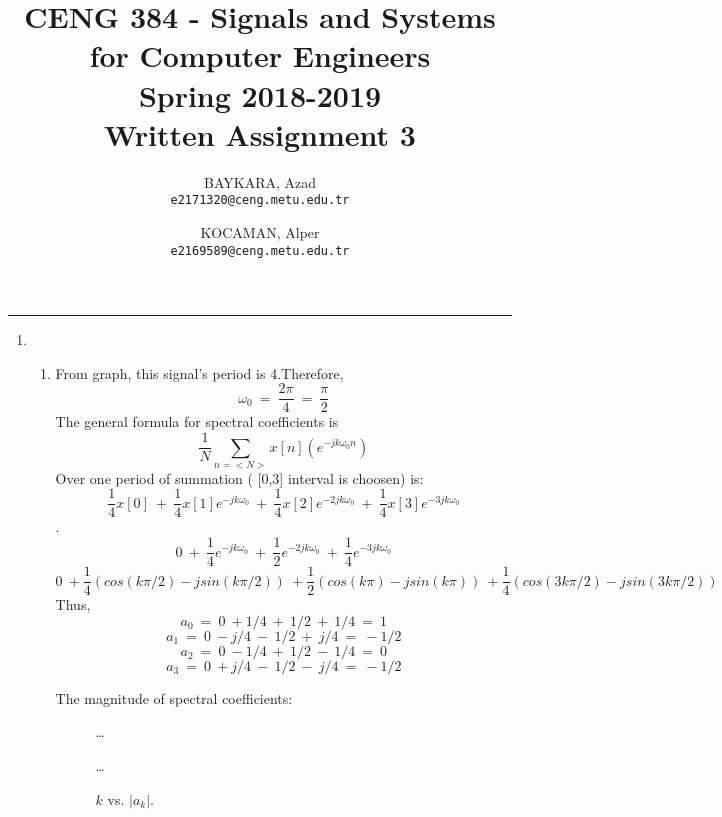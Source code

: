 \documentclass[10pt,a4paper, margin=1in]{article}
\author{
  BAYKARA, Azad\\
  \texttt{e2171320@ceng.metu.edu.tr}
  \and
  KOCAMAN, Alper\\
  \texttt{e2169589@ceng.metu.edu.tr}
}
\title{CENG 384 - Signals and Systems for Computer Engineers \\
Spring 2018-2019 \\
Written Assignment 3}
\begin{document}
\maketitle



\noindent\rule{19cm}{1.2pt}

\begin{enumerate}

\item 
    \begin{enumerate}
    \item %
From graph, this signal's period is 4.Therefore,
$$\omega_0\ =\ \frac{2\pi}{4}\ = \ \frac{\pi}{2} $$
The general formula for spectral coefficients is $$ \frac{1}{N}\sum_{n=<N>}^{} x[n](e^{-jk\omega_0 n})$$
Over one period of summation ( [0,3] interval is choosen) is:
$$ \frac{1}{4}x[0]\ + \  \frac{1}{4}x[1]e^{-jk\omega_0}\ + \   \frac{1}{4}x[2]e^{-2jk\omega_0}\ + \  \frac{1}{4}x[3]e^{-3jk\omega_0}$$.\\
$$ 0\ + \  \frac{1}{4}e^{-jk\omega_0}\ + \   \frac{1}{2}e^{-2jk\omega_0}\ + \  \frac{1}{4}e^{-3jk\omega_0}$$
$$0\ + \frac{1}{4}(cos(k \pi /2)-jsin(k \pi /2))\ + \frac{1}{2}(cos(k \pi)-jsin(k \pi))\ + \frac{1}{4}(cos(3k \pi /2)-jsin(3k \pi /2))$$
Thus,
$$ a_0\ =\ 0\ + 1/4\ +\ 1/2\ +\ 1/4\ =\ 1 $$
$$ a_1\ =\ 0\ - j/4\ -\ 1/2\ +\ j/4\ =\ -1/2 $$
$$ a_2\ =\ 0\ - 1/4\ +\ 1/2\ -\ 1/4\ =\ 0 $$
$$ a_3\ =\ 0\ + j/4\ -\ 1/2\ -\ j/4\ =\ -1/2 $$

The magnitude of spectral coefficients:

\begin{figure} [H]
	\ldots
    \centering
    \ldots
    \caption{$k$ vs. $|a_k|$.}
    \label{fig:q3}
\end{figure}


\end{enumerate}
\end{enumerate}
\end{document}
